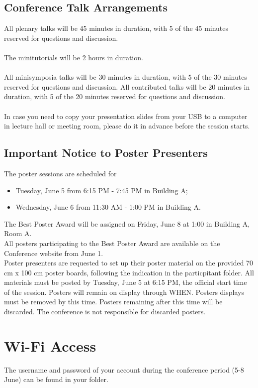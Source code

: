 \begin{multicols}{2}
\subsection*{Conference Talk Arrangements}
All plenary talks will be 45 minutes in duration,
with 5 of the 45 minutes reserved for questions and discussion.\\\\
The minitutorials will be 2 hours in duration.\\\\
All minisymposia talks will be 30 minutes in duration, with 5 of the 30
minutes reserved for questions and discussion.
All contributed talks will be 20 minutes in duration, with 5 of the 20
minutes reserved for questions and discussion.\\\\
In case you need to copy your presentation slides from your USB to a
computer in lecture hall or meeting room, please do it in advance before
the session starts.
\subsection*{Important Notice to Poster Presenters}
The poster sessions are scheduled for
\begin{itemize}
\item Tuesday, June 5 from 6:15 PM - 7:45 PM in Building A;
\item Wednesday, June 6 from 11:30 AM - 1:00 PM in Building A.
\end{itemize} 
The Best Poster Award will be assigned on Friday, June 8 at 1:00 in Building A, Room A.\\
All posters participating to the Best Poster Award are available on the Conference website from June 1.\\
Poster presenters are requested to set up
their poster material on the provided
70 cm x 100 cm poster boards, following the indication in the particpitant folder.  
All materials must
be posted by Tuesday, June 5 at
6:15 PM, the official start time of
the session. Posters will remain on display through WHEN.
Posters displays must be removed by this time. Posters remaining after this time will be discarded.
The conference is not responsible for
discarded posters.
\section*{Wi-Fi Access}
The username and password of your account during the conference period (5-8 June) can be found in your folder.

\end{multicols}
